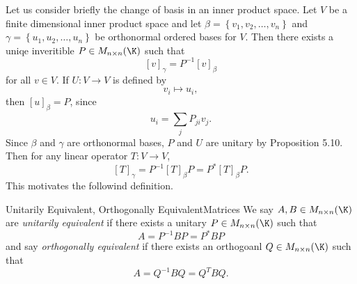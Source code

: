 \documentclass[linearalgebraII]{subfiles}
\begin{document}
    \begin{remark}
        Let us consider briefly the change of basis in an inner product space. Let $V$ be a finite dimensional inner product space and let $\beta = \left\lbrace v_1,v_2,\ldots,v_n \right\rbrace$ and $\gamma=\left\lbrace u_1,u_2,\ldots,u_n \right\rbrace$ be orthonormal ordered bases for $V$. Then there exists a uniqe inveritible $P\in M_{n\times n}(\K)$ such that
        \begin{equation*}
            \left[ v \right] _\gamma = P^{-1}\left[ v \right] _\beta
        \end{equation*}
        for all $v\in V$. If $U:V\to V$ is defined by
        \begin{equation*}
            v_i\mapsto u_i,
        \end{equation*}
        then $\left[ u \right] _\beta = P$, since
        \begin{equation*}
            u_i = \sum^{}_{j} P_{ji}v_j.
        \end{equation*}
        Since $\beta$ and $\gamma$ are orthonormal bases, $P$ and $U$ are unitary by Proposition 5.10. Then for any linear operator $T:V\to V$,
        \begin{equation*}
            \left[ T \right] _\gamma = P^{-1}\left[ T \right] _\beta P = P^*\left[ T \right] _\beta P.
        \end{equation*}
        This motivates the followind definition.
    \end{remark}

    \begin{definition}{Unitarily Equivalent, Orthogonally Equivalent}{Matrices}
        We say $A,B\in M_{n\times n}(\K)$ are \emph{unitarily equivalent} if there exists a unitary $P\in M_{n\times n}(\K)$ such that
        \begin{equation*}
            A = P^{-1}BP = P^*BP
        \end{equation*}
        and say \emph{orthogonally equivalent} if there exists an orthogoanl $Q\in M_{n\times n}(\K)$ such that
        \begin{equation*}
            A = Q^{-1}BQ = Q^TBQ.
        \end{equation*}
    \end{definition}

    
\end{document}
